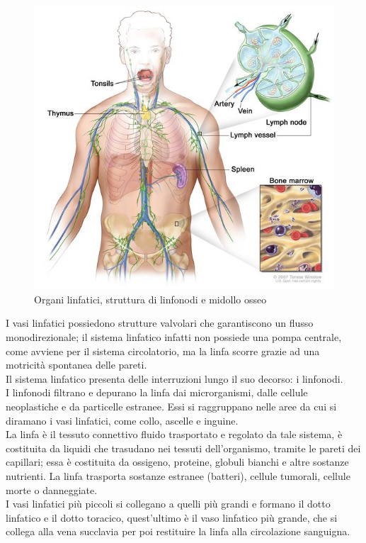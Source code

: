 \begin{figure}[H]
    \begin{center}
    \includegraphics[width=0.5\columnwidth]{img/anatomy.jpeg}
    \vspace{-3mm}
    \end{center}
    \caption{Organi linfatici, struttura di linfonodi e midollo osseo
    \cite{img2}}
    \label{fig:FIGURE_1.2}
\end{figure}

I vasi linfatici possiedono strutture valvolari che garantiscono un flusso monodirezionale; 
il sistema linfatico infatti non possiede una pompa centrale, 
come avviene per il sistema circolatorio, ma la linfa scorre grazie ad una motricità spontanea delle pareti.\\
Il sistema linfatico presenta delle interruzioni lungo il suo decorso: i linfonodi.\\ 
I linfonodi filtrano e depurano la linfa dai microrganismi, dalle cellule neoplastiche e 
da particelle estranee. Essi si raggruppano nelle aree da cui si diramano i vasi linfatici, 
come collo, ascelle e inguine.\\
La linfa è il tessuto connettivo fluido trasportato e regolato da tale sistema, è costituita 
da liquidi che trasudano nei tessuti dell'organismo, tramite le pareti dei capillari; essa è costituita 
da ossigeno, proteine, globuli bianchi e altre sostanze nutrienti. 
La linfa trasporta sostanze estranee (batteri), cellule tumorali, cellule morte o danneggiate.\\ 
I vasi linfatici più piccoli si collegano a quelli più grandi e formano il dotto linfatico e il dotto 
toracico, quest'ultimo è il vaso linfatico più grande, che si collega alla vena succlavia per poi restituire 
la linfa alla circolazione sanguigna\cite{BOOK1}.

